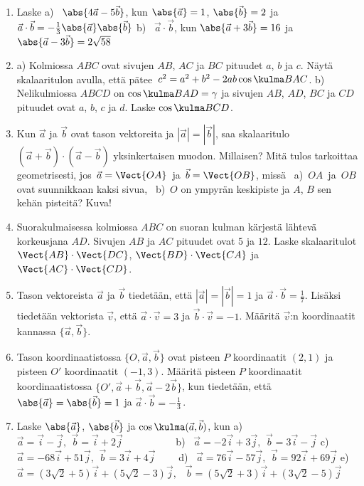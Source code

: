 \Harj
\begin{enumerate}

\item
Laske \newline
a) \ $\abs{4\vec a-5\vec b}$, kun $\abs{\vec a}=1$, $\abs{\vec b}=2$ ja 
     $\vec a\cdot\vec b=-\frac{1}{3}\abs{\vec a}\abs{\vec b}$ \newline
b) \ $\vec a\cdot\vec b$, kun $\abs{\vec a+3\vec b}=16$ ja $\abs{\vec a-3\vec b}=2\sqrt{58}$

\item
a) Kolmiossa $ABC$ ovat sivujen $AB$, $AC$ ja $BC$ pituudet $a$, $b$ ja $c$. Näytä skalaaritulon
avulla, että pätee $\,c^2 = a^2+b^2-2ab\cos\kulma BAC$. \newline
b) Nelikulmiossa $ABCD$ on $\cos\kulma BAD=\gamma$ ja sivujen $AB$, $AD$, $BC$ ja $CD$ pituudet
ovat $a$, $b$, $c$ ja $d$. Laske $\cos\kulma BCD$.

\item
Kun $\vec a$ ja $\vec b$ ovat tason vektoreita ja $|\vec a |=|\vec b |$, saa
skalaaritulo $(\vec a+\vec b)\cdot(\vec a-\vec b)$ yksinkertaisen muodon. Millaisen? Mitä 
tulos tarkoittaa geometrisesti, jos $\,\vec a=\Vect{OA}\,$ ja $\,\vec b=\Vect{OB}$, missä \ 
a) $\,OA\,$ ja $\,OB\,$ ovat suunnikkaan kaksi sivua, \ b) $\,O$ on ympyrän keskipiste ja
$A$, $B$ sen kehän pisteitä? Kuva! 

\item
Suorakulmaisessa kolmiossa $ABC$ on suoran kulman kärjestä lähtevä korkeusjana $AD$. Sivujen
$AB$ ja $AC$ pituudet ovat $5$ ja $12$. Laske skalaaritulot $\Vect{AB}\cdot\Vect{DC}$,
$\Vect{BD}\cdot\Vect{CA}$ ja $\Vect{AC}\cdot\Vect{CD}$.

\item
Tason vektoreista $\vec a$ ja $\vec b$ tiedetään, että $|\vec a|=|\vec b|=1$ ja
$\vec a \cdot \vec b =\frac{1}{7}$. Lisäksi tiedetään vektorista $\vec v$,
että $\vec a \cdot \vec v =3$ ja $\vec b \cdot \vec v =-1$. Määritä $\vec v$:n
koordinaatit kannassa $\{\vec a ,\vec b \}$.

\item
Tason koordinaatistossa $\{O,\vec a,\vec b\}$ ovat pisteen $P$ koordinaatit $(2,1)$ ja pisteen
$O'$ koordinaatit $(-1,3)$. Määritä pisteen $P$ koordinaatit koordinaatistossa
$\{O',\vec a+\vec b,\vec a-2\vec b\}$, kun tiedetään, että $\abs{\vec a}=\abs{\vec b}=1$ ja
$\vec a\cdot\vec b=-\frac{1}{3}\,$.

\item
Laske $\abs{\vec a}$, $\abs{\vec b}$ ja $\cos\kulma(\vec a,\vec b)$, kun \newline
a) \ $\vec a=\vec i-\vec j,\,\ \vec b=\vec i+2\vec j\qquad\qquad\quad$ \newline
b) \ $\vec a=-2\vec i+3\vec j,\,\  \vec b=3\vec i-\vec j$ \newline
c) \ $\vec a=-68\vec i+51\vec j,\,\ \vec b=3\vec i+4\vec j\qquad$ \newline
d) \ $\vec a=76\vec i-57\vec j,\,\ \vec b=92\vec i+69\vec j$ \newline
e) \ $\vec a=(3\sqrt{2}+5)\vec i+(5\sqrt{2}-3)\vec j,\ \ $
     $\vec b=(5\sqrt{2}+3)\vec i+(3\sqrt{2}-5)\vec j$


\end{enumerate}
